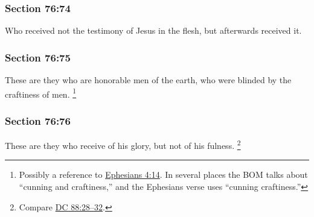 	\subsubsection{Section 76:74} %
		\label{DC76-74}

		Who received not the testimony of Jesus in the flesh, but afterwards received it.


	\subsubsection{Section 76:75} %
		\label{DC76-75}

		These are they who are honorable men of the earth, who were blinded by the craftiness of men.%
			\footnote{%
				Possibly a reference to \hyperref[EPHESIANS-4-14]{Ephesians 4:14}. In several places the BOM talks about ``cunning and craftiness,'' and the Ephesians verse uses ``cunning craftiness.'' 
				}


	\subsubsection{Section 76:76} %
		\label{DC76-76}

		These are they who receive of his glory, but not of his fulness.%
			\footnote{%
				Compare \hyperref[DC88-28]{DC 88:28--32}.
				}


